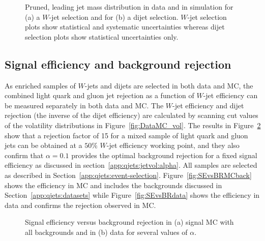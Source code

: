 \begin{figure}[htbp]
\centering
{}
\caption{Pruned, leading jet mass distribution in data and in simulation for (a) a $W$-jet selection and for (b) a dijet selection. $W$-jet selection plots show statistical and systematic uncertainties whereas dijet selection plots show statistical uncertainties only.}
\label{fig:Wpeak}
\end{figure}

\subsection{Signal efficiency and background rejection}
\label{app:qjets:jetvol:rejection}

As enriched samples of $W$-jets and dijets are selected in both data and MC, the combined light quark and gluon jet rejection as a function of $W$-jet efficiency can be measured separately in both data and MC. The $W$-jet efficiency and dijet rejection (the inverse of the dijet efficiency) are calculated by scanning cut values of the volatility distributions in Figure~\ref{fig:DataMC_vol}. The results in Figure~\ref{fig:SEvsBR} show that a rejection factor of 15 for a mixed sample of light quark and gluon jets can be obtained at a $50\%$ $W$-jet efficiency working point, and they also confirm that $\alpha = 0.1$ provides the optimal background rejection for a fixed signal efficiency as discussed in section~\ref{app:qjets:jetvol:alpha}. All samples are selected as described in Section~\ref{app:qjets:event-selection}. Figure~\ref{fig:SEvsBRMCback} shows the efficiency in MC and includes the backgrounds discussed in Section~\ref{app:qjets:datasets} while Figure~\ref{fig:SEvsBRdata} shows the efficiency in data and confirms the rejection observed in MC.

\begin{figure}[htbp]
\centering
\caption{Signal efficiency versus background rejection in (a) signal MC with all backgrounds and in (b) data for several values of $\alpha$.}%
\label{fig:SEvsBR}
\end{figure}

